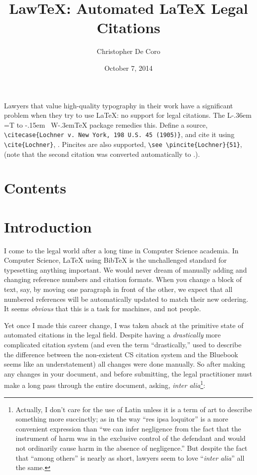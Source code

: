 \documentclass[letterpaper]{article}
\title{Law\TeX{}: Automated \LaTeX{} Legal Citations}
\author{Christopher De Coro}
\date{October 7, 2014}
\let\articleMaketitle=\maketitle
\let\articleSection=\section
\def\LawTeX{%
L\kern-.36em
{\setbox0=\hbox{T}%
\vbox to \ht0{\hbox{\the\scriptfont0 A}\vss}}%
\kern-.15em {\hbox{\the\scriptfont0 W}}\kern-.3em\TeX
}
\let\section=\articleSection
\begin{document}
\singlespacing
\frenchspacing
\articleMaketitle

Lawyers that value high-quality typography in their work have a significant problem when they try to use \LaTeX{}: no support for legal citations. 
The \LawTeX{} package remedies this. Define a source, \texttt{\textbackslash{}citecase\{Lochner v. New York, 198 U.S. 45 (1905)\}}, and cite it using \texttt{\textbackslash{}cite\{Lochner\}}, \cite{Lochner}. Pincites are also supported, \texttt{\textbackslash{}see \textbackslash{}pincite\{Lochner\}\{51\}}, \see{} (note that the second citation was converted automatically to \id.). 

\section*{Contents}
\begingroup
\renewcommand*\l@section[2]{%
    \addpenalty\@secpenalty%
    \setlength\@tempdima{1em}%
	{
      \parindent=0pt%
	  \@tocline{{#1}}{#2}
	}
}
\tableofcontents
\endgroup

\parskip=8pt

\section{Introduction}
I come to the legal world after a long time in Computer Science academia. In Computer Science, \LaTeX{} using Bib\TeX{} is the unchallenged standard for typesetting anything important. We would never dream of manually adding and changing reference numbers and citation formats. When you change a block of text, say, by moving one paragraph in front of the other, we expect that all numbered references will be automatically updated to match their new ordering. It seems \emph{obvious} that this is a task for machines, and not people. 

Yet once I made this career change, I was taken aback at the primitive state of automated citations in the legal field. Despite having a \emph{drastically} more complicated citation system (and even the term ``drastically,'' used to describe the difference between the non-existent CS citation system and the Bluebook seems like an understatement) all changes were done manually. So after making any changes in your document, and before submitting, the legal practitioner must make a long pass through the entire document, asking, \emph{inter alia}\footnote{Actually, I don't care for the use of Latin unless it is a term of art to describe something more succinctly; as in the way ``res ipsa loquitor'' is a more convenient expression than ``we can infer negligence from the fact that the instrument of harm was in the exclusive control of the defendant and would not ordinarily cause harm in the absence of negligence.'' But despite the fact that ``among others'' is nearly as short, lawyers seem to love ``\emph{inter alia}'' all the same.}:
\end{document}
